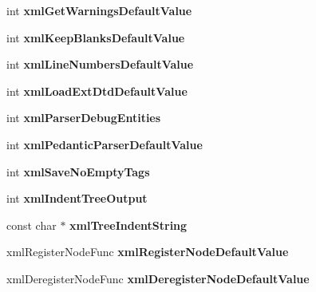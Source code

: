\begin{DoxyCompactItemize}
int {\bfseries xml\+Get\+Warnings\+Default\+Value}
\item 
\mbox{\label{struct__xml_global_state_aafbd2893936cc7e0b906277bf4476f26}} 
int {\bfseries xml\+Keep\+Blanks\+Default\+Value}
\item 
\mbox{\label{struct__xml_global_state_a60edc1852ca27c7910919b2b0813f0f8}} 
int {\bfseries xml\+Line\+Numbers\+Default\+Value}
\item 
\mbox{\label{struct__xml_global_state_a5372304342b0799d753b848b4ff797f2}} 
int {\bfseries xml\+Load\+Ext\+Dtd\+Default\+Value}
\item 
\mbox{\label{struct__xml_global_state_ab1de5b17ba7c598ab79b3f842f017c26}} 
int {\bfseries xml\+Parser\+Debug\+Entities}
\item 
\mbox{\label{struct__xml_global_state_aed754d7889fb431e0d9623660db32ea3}} 
int {\bfseries xml\+Pedantic\+Parser\+Default\+Value}
\item 
\mbox{\label{struct__xml_global_state_a2e91a726bfc9552958e60c867ebb4a7b}} 
int {\bfseries xml\+Save\+No\+Empty\+Tags}
\item 
\mbox{\label{struct__xml_global_state_a321904b6d88296e892ebe7120aa62ace}} 
int {\bfseries xml\+Indent\+Tree\+Output}
\item 
\mbox{\label{struct__xml_global_state_aaa0df8b1a4d5a8fbcdde46d286e78625}} 
const char $\ast$ {\bfseries xml\+Tree\+Indent\+String}
\item 
\mbox{\label{struct__xml_global_state_a30d6034926e4292ce0feec490008c568}} 
xml\+Register\+Node\+Func {\bfseries xml\+Register\+Node\+Default\+Value}
\item 
\mbox{\label{struct__xml_global_state_a7dd29e256c9eeb78789c6f483bd4098b}} 
xml\+Deregister\+Node\+Func {\bfseries xml\+Deregister\+Node\+Default\+Value}
\item 
\mbox{\label{struct__xml_global_state_ab2b37c13cce8ccc8a7bb0e0a47474563}} 

\end{DoxyCompactItemize}

